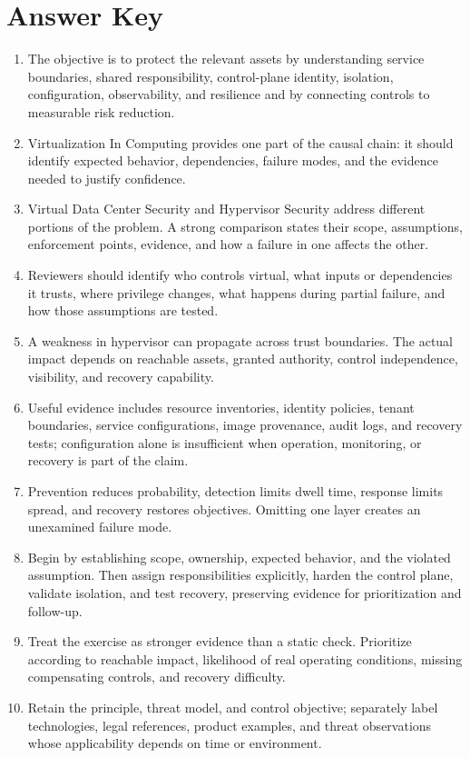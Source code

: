 \documentclass[11pt]{article}
\begin{document}
\section*{Answer Key}
\begin{enumerate}
\item The objective is to protect the relevant assets by understanding service boundaries, shared responsibility, control-plane identity, isolation, configuration, observability, and resilience and by connecting controls to measurable risk reduction.
\item Virtualization In Computing provides one part of the causal chain: it should identify expected behavior, dependencies, failure modes, and the evidence needed to justify confidence.
\item Virtual Data Center Security and Hypervisor Security address different portions of the problem. A strong comparison states their scope, assumptions, enforcement points, evidence, and how a failure in one affects the other.
\item Reviewers should identify who controls virtual, what inputs or dependencies it trusts, where privilege changes, what happens during partial failure, and how those assumptions are tested.
\item A weakness in hypervisor can propagate across trust boundaries. The actual impact depends on reachable assets, granted authority, control independence, visibility, and recovery capability.
\item Useful evidence includes resource inventories, identity policies, tenant boundaries, service configurations, image provenance, audit logs, and recovery tests; configuration alone is insufficient when operation, monitoring, or recovery is part of the claim.
\item Prevention reduces probability, detection limits dwell time, response limits spread, and recovery restores objectives. Omitting one layer creates an unexamined failure mode.
\item Begin by establishing scope, ownership, expected behavior, and the violated assumption. Then assign responsibilities explicitly, harden the control plane, validate isolation, and test recovery, preserving evidence for prioritization and follow-up.
\item Treat the exercise as stronger evidence than a static check. Prioritize according to reachable impact, likelihood of real operating conditions, missing compensating controls, and recovery difficulty.
\item Retain the principle, threat model, and control objective; separately label technologies, legal references, product examples, and threat observations whose applicability depends on time or environment.
\end{enumerate}
\end{document}
